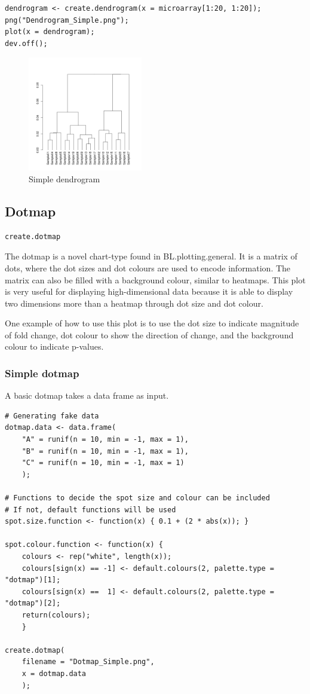 \documentclass[letterpaper]{article}
\begin{document}
\begin{verbatim}
dendrogram <- create.dendrogram(x = microarray[1:20, 1:20]);
png("Dendrogram_Simple.png");
plot(x = dendrogram);
dev.off();

\end{verbatim}
\begin{figure}[!ht]
  \begin{center}
     \includegraphics[width=50mm]{Figures/Dendrogram_Simple.png}
     \caption{Simple dendrogram}
  \end{center}
\end{figure}

\subsection{Dotmap}
\begin{verbatim}
create.dotmap
\end{verbatim}

The dotmap is a novel chart-type found in BL.plotting.general. It is a matrix of dots, where the dot sizes and dot colours are used to encode information. The matrix can also be filled with a background colour, similar to heatmaps. This plot is very useful for displaying high-dimensional data because it is able to display two dimensions more than a heatmap through dot size and dot colour.

One example of how to use this plot is to use the dot size to indicate magnitude of fold change, dot colour to show the direction of change, and the background colour to indicate p-values.

\subsubsection{Simple dotmap}
A basic dotmap takes a data frame as input.
\begin{verbatim}
# Generating fake data
dotmap.data <- data.frame(
    "A" = runif(n = 10, min = -1, max = 1),
    "B" = runif(n = 10, min = -1, max = 1),
    "C" = runif(n = 10, min = -1, max = 1)
    );

# Functions to decide the spot size and colour can be included
# If not, default functions will be used
spot.size.function <- function(x) { 0.1 + (2 * abs(x)); }

spot.colour.function <- function(x) {
    colours <- rep("white", length(x));
    colours[sign(x) == -1] <- default.colours(2, palette.type = "dotmap")[1];
    colours[sign(x) ==  1] <- default.colours(2, palette.type = "dotmap")[2];
    return(colours);
    }

create.dotmap(
    filename = "Dotmap_Simple.png",
    x = dotmap.data
    );
\end{verbatim}
\end{document}
